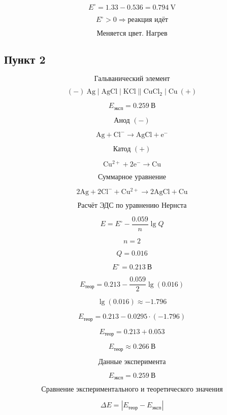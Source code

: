 \documentclass[a4paper, 12pt]{article}
\begin{document}
\[
    E^\circ = 1.33 - 0.536 = 0.794\ \mathrm{V}
\]

\[
    \boxed{E^\circ > 0 \Rightarrow \text{реакция идёт}}
\]

\[
    \text{Меняется цвет. Нагрев}
\]

\newpage

\subsection*{Пункт 2}

\[
    \boxed{\text{Гальванический элемент}}
\]

\[
    \mathrm{(-)\ Ag \mid AgCl \mid KCl \parallel CuCl_2 \mid Cu\ (+)}
\]

\[
    E_{\text{эксп}} = 0.259\ \mathrm{В}
\]

\[
    \boxed{\text{Анод }(-)}
\]

\[
    \mathrm{Ag + Cl^- \rightarrow AgCl + e^-}
\]

\[
    \boxed{\text{Катод }(+)}
\]

\[
    \mathrm{Cu^{2+} + 2e^- \rightarrow Cu}
\]

\[
    \boxed{\text{Суммарное уравнение}}
\]

\[
    \mathrm{2Ag + 2Cl^- + Cu^{2+} \rightarrow 2AgCl + Cu}
\]

\[
    \boxed{\text{Расчёт ЭДС по уравнению Нернста}}
\]

\[
    E = E^\circ - \frac{0.059}{n}\lg Q
\]

\[
    n = 2
\]

\[
    Q = 0.016
\]

\[
    E^\circ = 0.213\ \mathrm{В}
\]

\[
    E_{\text{теор}}
    =
    0.213 - \frac{0.059}{2}\lg(0.016)
\]

\[
    \lg(0.016) \approx -1.796
\]

\[
    E_{\text{теор}}
    =
    0.213 - 0.0295 \cdot (-1.796)
\]

\[
    E_{\text{теор}}
    =
    0.213 + 0.053
\]

\[
    \boxed{
        E_{\text{теор}} \approx 0.266\ \mathrm{В}
    }
\]

\[
    \boxed{\text{Данные эксперимента}}
\]

\[
    E_{\text{эксп}} = 0.259\ \mathrm{В}
\]

\[
    \boxed{\text{Сравнение экспериментального и теоретического значения}}
\]

\[
    \Delta E =
    \left|E_{\text{теор}} - E_{\text{эксп}}\right|
\]
\end{document}
